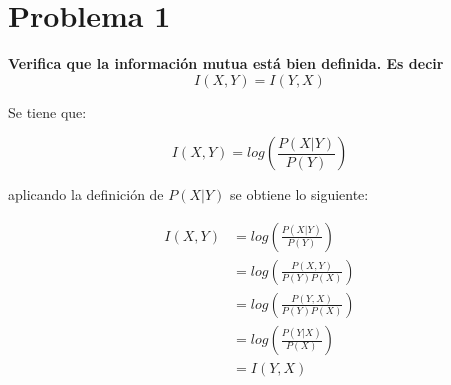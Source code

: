 \section*{Problema 1}
\textbf{Verifica que la información mutua está bien definida. Es decir}
\begin{equation*}
    I(X,Y)=I(Y,X)
\end{equation*}

Se tiene que:

\begin{equation*}
    I(X,Y) = log \left (\frac{P(X|Y)}{P(Y)}\right )
\end{equation*}

aplicando la definición de $P(X|Y)$ se obtiene lo siguiente:

\begin{align*}
    I(X,Y) & = log \left (\frac{P(X|Y)}{P(Y)}\right )     \\
           & = log \left (\frac{P(X,Y)}{P(Y)P(X)}\right ) \\
           & = log \left (\frac{P(Y,X)}{P(Y)P(X)}\right ) \\
           & = log \left (\frac{P(Y|X)}{P(X)}\right )     \\
           & = I(Y,X)
\end{align*}